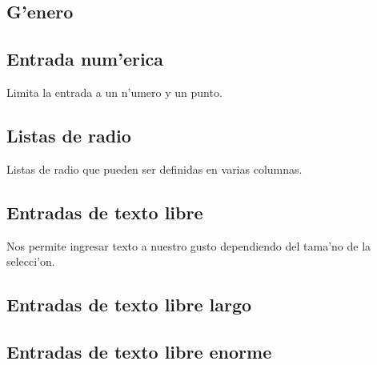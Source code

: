 \documentclass[12pt,spanish]{report}
\begin{document}
\subsection {G'enero}

\par
\centerline{\hbox{}}
\par

\subsection {Entrada num'erica}
Limita la entrada a un n'umero y un punto.
\par
\centerline{\hbox{}}
\par

\subsection {Listas de radio}
Listas de radio que pueden ser definidas en varias columnas.\\
\par
\centerline{\hbox{}}
\par

\subsection {Entradas de texto libre}
Nos permite ingresar texto a nuestro gusto dependiendo del tama'no de la selecci'on.\\
\par
\centerline{\hbox{}}
\par

\subsection {Entradas de texto libre largo}
\par
\centerline{\hbox{}}
\par

\subsection {Entradas de texto libre enorme}
\par
\centerline{\hbox{}}
\par
\end{document}
